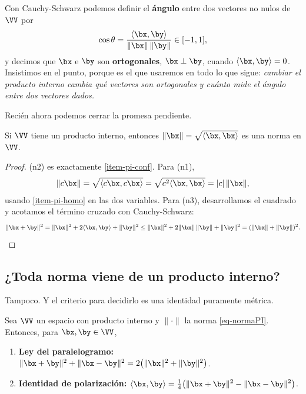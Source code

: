 Con Cauchy-Schwarz podemos definir el \textbf{ángulo} entre dos vectores no
nulos de $\VV$ por
\begin{equation}\label{eq:angulo-general}
\cos\theta=\frac{\langle\bx,\by\rangle}{\|\bx\|\,\|\by\|}\in[-1,1] ,
\end{equation}
y decimos que $\bx$ e $\by$ son \textbf{ortogonales}, $\bx\perp\by$, cuando
$\langle\bx,\by\rangle=0$. Insistimos en el punto, porque es el que usaremos
en todo lo que sigue: \emph{cambiar el producto interno cambia qué vectores
son ortogonales y cuánto mide el ángulo entre dos vectores dados.}

Recién ahora podemos cerrar la promesa pendiente.

\begin{theorem}\label{teo-normapi}
Si $\VV$ tiene un producto interno, entonces
$\|\bx\|=\sqrt{\langle\bx,\bx\rangle}$ es una norma en $\VV$.
\end{theorem}

\begin{proof}
(n2) es exactamente \ref{item-pi-conf}. Para (n1),
\[
\|c\bx\|=\sqrt{\langle c\bx,c\bx\rangle}=\sqrt{c^2\langle\bx,\bx\rangle}
=|c|\,\|\bx\| ,
\]
usando \ref{item-pi-homo} en las dos variables. Para (n3), desarrollamos el
cuadrado y acotamos el término cruzado con Cauchy-Schwarz:
\[
\|\bx+\by\|^2=\|\bx\|^2+2\langle\bx,\by\rangle+\|\by\|^2
\le\|\bx\|^2+2\|\bx\|\,\|\by\|+\|\by\|^2=(\|\bx\|+\|\by\|)^2 . \qedhere
\]
\end{proof}

\subsection{¿Toda norma viene de un producto interno?}

Tampoco. Y el criterio para decidirlo es una identidad puramente métrica.

\begin{prop}\label{propo-propPI}
Sea $\VV$ un espacio con producto interno y $\|\cdot\|$ la norma
\eqref{eq-normaPI}. Entonces, para $\bx,\by\in\VV$,
\begin{enumerate}[label=\textup{(\alph*)},itemsep=2pt]
\item \textup{\textbf{Ley del paralelogramo:}}
$\|\bx+\by\|^2+\|\bx-\by\|^2=2\big(\|\bx\|^2+\|\by\|^2\big)$.
\item \textup{\textbf{Identidad de polarización:}}
$\displaystyle\langle\bx,\by\rangle
=\tfrac14\big(\|\bx+\by\|^2-\|\bx-\by\|^2\big)$.
\end{enumerate}
\end{prop}

